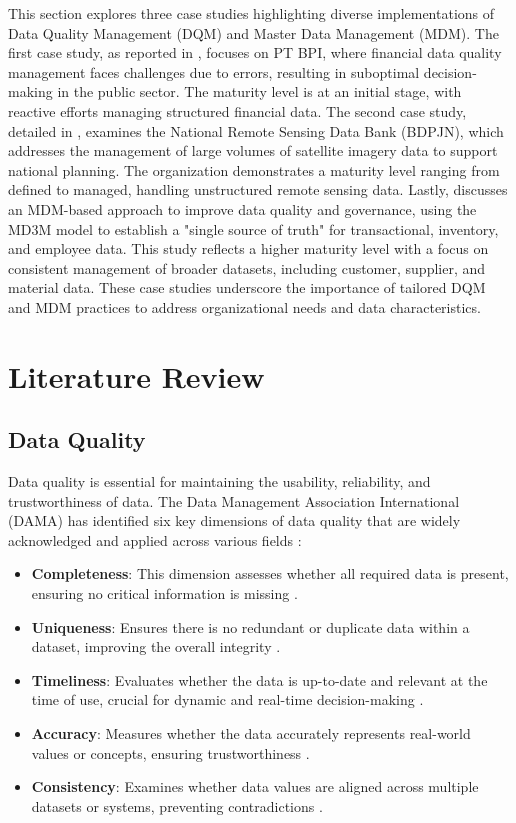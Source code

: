 \documentclass[conference]{IEEEtran}
\begin{document}
This section explores three case studies highlighting diverse implementations of Data Quality Management (DQM) and Master Data Management (MDM). The first case study, as reported in \cite{dqmBPI2022}, focuses on PT BPI, where financial data quality management faces challenges due to errors, resulting in suboptimal decision-making in the public sector. The maturity level is at an initial stage, with reactive efforts managing structured financial data. The second case study, detailed in \cite{payani2023}, examines the National Remote Sensing Data Bank (BDPJN), which addresses the management of large volumes of satellite imagery data to support national planning. The organization demonstrates a maturity level ranging from defined to managed, handling unstructured remote sensing data. Lastly, \cite{hikmawati2021} discusses an MDM-based approach to improve data quality and governance, using the MD3M model to establish a "single source of truth" for transactional, inventory, and employee data. This study reflects a higher maturity level with a focus on consistent management of broader datasets, including customer, supplier, and material data. These case studies underscore the importance of tailored DQM and MDM practices to address organizational needs and data characteristics.


\section{Literature Review}

\subsection{Data Quality}

Data quality is essential for maintaining the usability, reliability, and trustworthiness of data. The Data Management Association International (DAMA) has identified six key dimensions of data quality that are widely acknowledged \cite{DAMA_2013} and applied across various fields \cite{wahyudi2023data, kiran2024addressing, antonio2024data}:  

\begin{itemize}
    \item \textbf{Completeness}: This dimension assesses whether all required data is present, ensuring no critical information is missing \cite{mahanti2019data}.
    \item \textbf{Uniqueness}: Ensures there is no redundant or duplicate data within a dataset, improving the overall integrity \cite{sebastiancoleman2022meeting}.
    \item \textbf{Timeliness}: Evaluates whether the data is up-to-date and relevant at the time of use, crucial for dynamic and real-time decision-making \cite{mashoufi2023data}.
    \item \textbf{Accuracy}: Measures whether the data accurately represents real-world values or concepts, ensuring trustworthiness \cite{west2021towards}.
    \item \textbf{Consistency}: Examines whether data values are aligned across multiple datasets or systems, preventing contradictions \cite{antonio2024data}.
\end{itemize}
\end{document}

